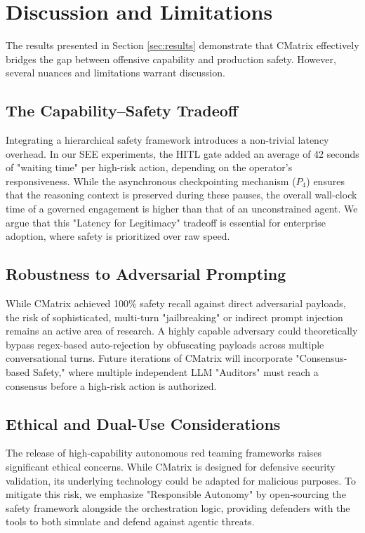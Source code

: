 \section{Discussion and Limitations}
\label{sec:discussion}

The results presented in Section \ref{sec:results} demonstrate that CMatrix effectively bridges the gap between offensive capability and production safety. However, several nuances and limitations warrant discussion.

\subsection{The Capability--Safety Tradeoff}
Integrating a hierarchical safety framework introduces a non-trivial latency overhead. In our SEE experiments, the HITL gate added an average of 42 seconds of "waiting time" per high-risk action, depending on the operator's responsiveness. While the asynchronous checkpointing mechanism ($P_4$) ensures that the reasoning context is preserved during these pauses, the overall wall-clock time of a governed engagement is higher than that of an unconstrained agent. We argue that this "Latency for Legitimacy" tradeoff is essential for enterprise adoption, where safety is prioritized over raw speed.

\subsection{Robustness to Adversarial Prompting}
While CMatrix achieved 100\% safety recall against direct adversarial payloads, the risk of sophisticated, multi-turn "jailbreaking" or indirect prompt injection remains an active area of research. A highly capable adversary could theoretically bypass regex-based auto-rejection by obfuscating payloads across multiple conversational turns. Future iterations of CMatrix will incorporate "Consensus-based Safety," where multiple independent LLM "Auditors" must reach a consensus before a high-risk action is authorized.

\subsection{Ethical and Dual-Use Considerations}
The release of high-capability autonomous red teaming frameworks raises significant ethical concerns. While CMatrix is designed for defensive security validation, its underlying technology could be adapted for malicious purposes. To mitigate this risk, we emphasize "Responsible Autonomy" by open-sourcing the safety framework alongside the orchestration logic, providing defenders with the tools to both simulate and defend against agentic threats.

